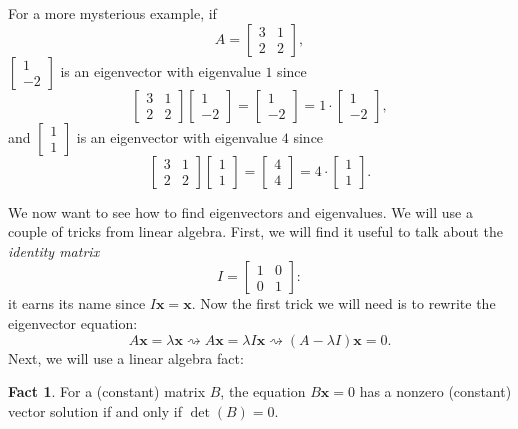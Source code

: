 \documentclass[12pt]{amsart}
\numberwithin{equation}{section}
\theoremstyle{plain} %
\newcommand{\rsa}{\rightsquigarrow}
\theoremstyle{definition}
\newtheorem{fact}[equation]{Fact}
\theoremstyle{remark}
\begin{document}
For a more mysterious example, if 
\[ A = \begin{bmatrix} 3 & 1  \\ 2 & 2\end{bmatrix},\]
$\begin{bmatrix} 1 \\ -2\end{bmatrix}$ is an eigenvector with eigenvalue $1$ since
\[ \begin{bmatrix} 3 & 1  \\ 2 & 2\end{bmatrix}\begin{bmatrix} 1 \\ -2\end{bmatrix}= \begin{bmatrix} 1 \\ -2\end{bmatrix} = 1\cdot \begin{bmatrix} 1 \\ -2\end{bmatrix},\]
and 
$\begin{bmatrix} 1 \\ 1\end{bmatrix}$ is an eigenvector with eigenvalue $4$ since
\[ \begin{bmatrix} 3 & 1  \\ 2 & 2\end{bmatrix}\begin{bmatrix} 1 \\ 1\end{bmatrix}= \begin{bmatrix} 4 \\ 4\end{bmatrix} = 4\cdot \begin{bmatrix} 1 \\ 1\end{bmatrix}.\]

We now want to see how to find eigenvectors and eigenvalues. We will use a couple of tricks from linear algebra. First, we will find it useful to talk about the \emph{identity matrix}
\[ I = \begin{bmatrix} 1 & 0 \\ 0 & 1\end{bmatrix}:\]
it earns its name since $I \mathbf{x} = \mathbf{x}$. Now the first trick we will need is to rewrite the eigenvector equation:
\[ A \mathbf{x} = \lambda \mathbf{x} \rsa A \mathbf{x} = \lambda I \mathbf{x}  \rsa (A-\lambda I) \mathbf{x} =0.\]
Next, we will use a linear algebra fact:
\begin{fact} For a (constant) matrix $B$, the equation $B\mathbf{x}=0$ has a nonzero (constant) vector solution if and only if $\det(B) = 0$.
\end{fact}
\end{document}
